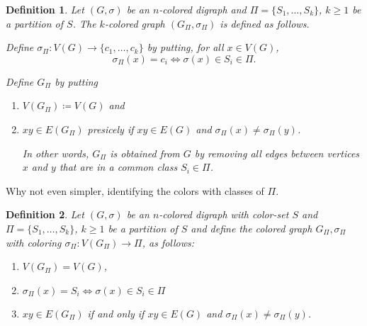 \documentclass[final,3p,times]{elsarticle}
\newtheorem{definition}{Definition}[section]
\newcommand{\TODO}[1]{\begingroup\color{red}#1\endgroup}
\newcommand{\PFS}[1]{\begingroup\color{magenta}#1\endgroup}
\begin{document}
%	


	
	
\begin{definition}
	Let $(G,\sigma)$ be an $n$-colored digraph and $\Pi = \{S_1,\dots,S_k\}$, $k\geq 1$
	be a partition of $S$. The $k$-colored graph $(G_{\Pi},\sigma_{\Pi})$ is defined as follows. 
	
	
	Define $\sigma_{\Pi}\colon V(G) \to \{c_1,\dots,c_k\}$ by putting, for all $x\in V(G)$, 
    \[\sigma_{\Pi}(x)=c_i \iff \sigma(x)\in S_i\in \Pi.\] 
    
    Define  $G_{\Pi}$ by putting
	\begin{enumerate}
    	\item $V(G_{\Pi}) \coloneqq V(G)$ and
    
    \item $xy\in E(G_{\Pi})$  presicely if $xy\in E(G)$ and 
    	  $\sigma_{\Pi}(x)\neq \sigma_{\Pi}(y)$. 
    	  
    	  In other words,  $G_{\Pi}$ 
    	  is obtained from $G$ by removing all
    	  edges between vertices $x$ and $y$ that are 
    	  in a common class $S_i\in \Pi$. 
\end{enumerate}
\end{definition}	

\PFS{Why not even simpler, identifying the colors with classes of $\Pi$.


\begin{definition}
  Let $(G,\sigma)$ be an $n$-colored digraph with color-set $S$ and $\Pi =
  \{S_1,\dots,S_k\}$, $k\geq 1$ be a partition of $S$ and define the
  colored graph $G_{\Pi},\sigma_{\Pi}$ with coloring $\sigma_{\Pi}\colon
  V(G_{\Pi})\to \Pi$, as follows:
  \begin{enumerate}
  \item $V(G_{\Pi})=V(G)$,
  \item $\sigma_{\Pi}(x)=S_i \iff \sigma(x)\in S_i\in\Pi$ 
  \item $xy\in E(G_{\Pi})$  if and only if $xy\in E(G)$ and 
    	  $\sigma_{\Pi}(x)\neq \sigma_{\Pi}(y)$. 
  \end{enumerate}
\end{definition}	
}
	
\end{document}
